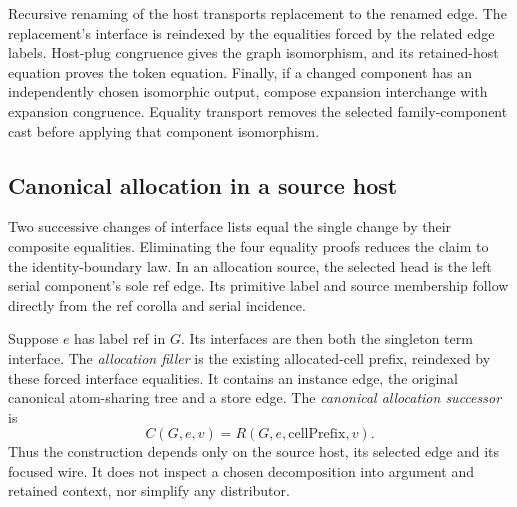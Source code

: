 

Recursive renaming of the host transports replacement to the renamed edge.
The replacement's interface is reindexed by the equalities forced by the
related edge labels. Host-plug congruence gives the graph isomorphism, and
its retained-host equation proves the token equation. Finally, if a changed
component has an independently chosen isomorphic output, compose expansion
interchange with expansion congruence. Equality transport removes the selected
family-component cast before applying that component isomorphism.



\subsection{Canonical allocation in a source host}

Two successive changes of interface lists equal the single change by their
composite equalities. Eliminating the four equality proofs reduces the claim
to the identity-boundary law. In an allocation source, the selected head is
the left serial component's sole ref edge. Its primitive label and source
membership follow directly from the ref corolla and serial incidence.




Suppose $e$ has label ref in $G$. Its interfaces are then both the singleton
term interface. The \emph{allocation filler} is the existing allocated-cell
prefix, reindexed by these forced interface equalities. It contains an
instance edge, the original canonical atom-sharing tree and a store edge.
The \emph{canonical allocation successor} is
\[
 C(G,e,v)=R(G,e,\mathrm{cellPrefix},v).
\]
Thus the construction depends only on the source host, its selected edge and
its focused wire. It does not inspect a chosen decomposition into argument
and retained context, nor simplify any distributor.


